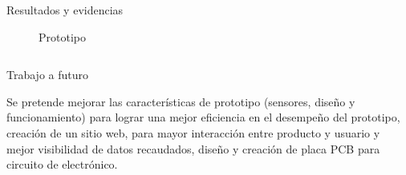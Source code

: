 \documentclass{beamer}
\begin{document}
\begin{frame}[fragile]{}
\begin{columns}[t]
\begin{column}{0.46\linewidth}
\begin{block}{Resultados y evidencias}
\begin{figure}[H]
	 		\caption{Prototipo}
	 	\end{figure}
	 	

	 	 
	 	\end{block}
	 \end{column}
	\end{columns}
 
 	\justifying
 	\begin{columns}[t]
 
  
  \begin{column}{0.46\linewidth}
  	\begin{block}{Trabajo a futuro}
  		\begin{minipage}[t]{1\textwidth}
  			\vspace{0pt}
 Se pretende mejorar las características de prototipo (sensores, diseño y funcionamiento) para lograr una mejor eficiencia en el desempeño del prototipo, creación de un sitio web, para mayor interacción entre producto y usuario y mejor visibilidad de datos recaudados, diseño y creación de placa PCB para circuito de electrónico.
  		\end{minipage} 
  	\end{block}
  \end{column}


\end{columns}
\end{frame}
\end{document}
